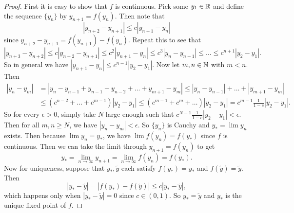 \begin{proof}
  First it is easy to show that $f$ is continuous.
  Pick some $y_1 \in \mathbb{R}$ and define the sequence
  $\{y_n\}$ by $y_{n + 1} = f(y_n)$. Then note that
  \[
    |y_{n + 2} - y_{n + 1}| \le c |y_{n + 1} - y_n|
  \]
  since $y_{n + 2} - y_{n + 1} = f(y_{n + 1}) - f(y_n)$.
  Repeat this to see that
  \[
    |y_{n + 3} - y_{n + 2}| \le c |y_{n + 2} - y_{n + 1}|
    \le c^2 |y_{n + 1} - y_n|
    \le c^3 |y_n - y_{n - 1}|
    \le \dots
    \le c^{n + 1} |y_2 - y_1|
  .\]
  So in general we have
  $|y_{n + 1} - y_n| \le c^{n - 1}|y_2 - y_1|$.
  Now let $m, n \in \mathbb{N}$ with $m < n$. Then
  \begin{align*}
    |y_n - y_m|
    &= |y_n - y_{n - 1} + y_{n - 1} - y_{n - 2} + \dots + y_{m + 1} - y_m|
    \le |y_n - y_{n - 1}| + \dots + |y_{m + 1} - y_m| \\
    &\le (c^{n - 2} + \dots + c^{m - 1}) |y_2 - y_1|
    \le (c^{m - 1} + c^m + \dots) |y_2 - y_1|
    = c^{m - 1} \frac{1}{1 - c} |y_2 - y_1|.
  \end{align*}
  So for every $\epsilon > 0$, simply take $N$ large
  enough such that
  $c^{N - 1} \frac{1}{1 - c} |y_2 - y_1| < \epsilon$.
  Then for all $m, n \ge N$, we have
  $|y_n - y_m| < \epsilon$. So $\{y_n\}$ is Cauchy and
  $y_* = \lim y_n$ exists. Then because $\lim y_n = y_*$,
  we have $\lim f(y_n) = f(y_*)$ since $f$ is continuous.
  Then we can take the limit through $y_{n + 1} = f(y_n)$
  to get
  \[y_* = \lim_{n \to \infty} y_{n + 1} = \lim_{n \to \infty} f(y_n) = f(y_*).\]
  Now for uniqueness, suppose that
  $y_*, \widetilde{y}$ each satisfy $f(y_*) = y_*$ and
  $f(\widetilde{y}) = \widetilde{y}$. Then
  \[|y_* - \widetilde{y}| = |f(y_*) - f(\widetilde{y})| \le c |y_* - \widetilde{y}|,\]
  which happens only when $|y_* - \widetilde{y}| = 0$ since
  $c \in (0, 1)$. So $y_* = \widetilde{y}$ and
  $y_*$ is the unique fixed point of $f$.
\end{proof}

